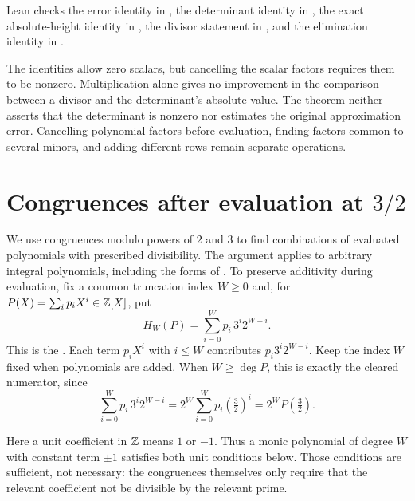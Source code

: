 \documentclass[11pt]{article}
\begin{document}
\noindent Lean checks the error identity in
, the determinant identity in
, the exact absolute-height identity in
, the divisor statement in
, and the elimination identity in
.

The identities allow zero scalars, but cancelling the scalar factors
requires them to be nonzero. Multiplication alone gives no improvement
in the comparison between a divisor and the determinant's absolute
value. The theorem neither asserts that the determinant is nonzero nor
estimates the original approximation error. Cancelling polynomial
factors before evaluation, finding factors common to several minors,
and adding different rows remain separate operations.

\section{Congruences after evaluation at \texorpdfstring{$3/2$}{3/2}}\label{long1049:sec:endpoints}

We use congruences modulo powers of $2$ and $3$ to find combinations
of evaluated polynomials with prescribed divisibility. The argument
applies to arbitrary integral polynomials, including the forms of
\cite[Sections~3--5]{zudilin2004}. To preserve additivity during
evaluation, fix a common truncation index $W\ge0$ and, for
$P(X)=\sum_i p_iX^i\in\mathbb{Z}[X]$, put
\[
 H_W(P)=\sum_{i=0}^{W}p_i\,3^i2^{W-i}.
\]
This is the
.  Each term \(p_iX^i\) with \(i\le W\) contributes
\(p_i3^i2^{W-i}\). Keep the index \(W\) fixed when polynomials are
added. When \(W\ge\deg P\), this is exactly the cleared numerator, since
\[
 \sum_{i=0}^{W}p_i\,3^i2^{W-i}=2^{W}\sum_{i=0}^{W}p_i\left(\tfrac32\right)^{i}
 =2^{W}P\!\left(\tfrac32\right).
\]

Here a unit coefficient in $\mathbb{Z}$ means $1$ or $-1$. Thus a monic
polynomial of degree $W$ with constant term $\pm1$ satisfies both unit
conditions below. Those conditions are sufficient, not necessary:
the congruences themselves only require that the relevant coefficient
not be divisible by the relevant prime.
\end{document}
